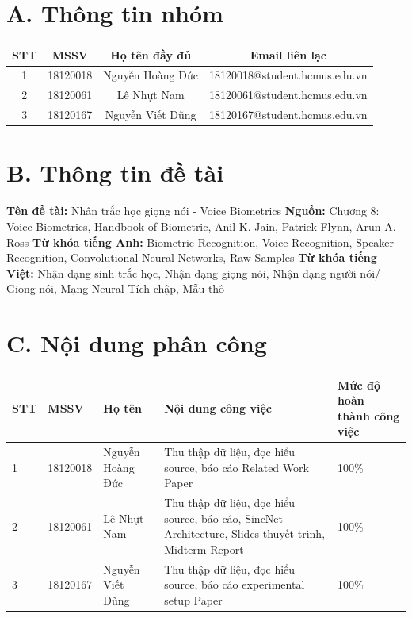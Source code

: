 \documentclass{article}
\newcommand\T{\rule{0pt}{2.6ex}}       %
\newcommand\B{\rule[-1.2ex]{0pt}{0pt}} %
\begin{document}
	\newpage
	\tableofcontents
	\newpage
	\setcounter{secnumdepth}{0}
	
	\section{A. Thông tin nhóm}
	\begin{tabular}{ | c | c | c | c |}\hline
		STT	& MSSV & Họ tên đầy đủ & Email liên lạc \T\B\\\hline
		1	& 18120018 & Nguyễn Hoàng Đức &  18120018@student.hcmus.edu.vn\T\B\\\hline
		2	& 18120061 & Lê Nhựt Nam &  18120061@student.hcmus.edu.vn\T\B\\\hline
		3	& 18120167 & Nguyễn Viết Dũng & 18120167@student.hcmus.edu.vn\T\B\\ \hline
	\end{tabular}
			
	\section{B. Thông tin đề tài}
	
	\textbf{Tên đề tài:} Nhân trắc học giọng nói - Voice Biometrics\newline
	\textbf{Nguồn:} Chương 8: Voice Biometrics, Handbook of Biometric, Anil K. Jain, Patrick Flynn, Arun A. Ross\newline
	\textbf{Từ khóa tiếng Anh:} Biometric Recognition, Voice Recognition, Speaker Recognition, Convolutional Neural Networks, Raw Samples\newline
	\textbf{Từ khóa tiếng Việt:} Nhận dạng sinh trắc học, Nhận dạng giọng nói, Nhận dạng người nói/ Giọng nói, Mạng Neural Tích chập, Mẫu thô
	
	\section{C. Nội dung phân công}
	\begin{center}
		\begin{tabular}{ | l | l | l | p{5cm} | p{3cm} |}
			\hline
			STT & MSSV & Họ tên & Nội dung công việc & Mức độ hoàn thành công việc  \T\B\\ \hline
			1 & 18120018 & Nguyễn Hoàng Đức & Thu thập dữ liệu, đọc hiểu source, báo cáo Related Work Paper & 100\%\T\B \\ \hline
			2 & 18120061 & Lê Nhựt Nam & Thu thập dữ liệu, đọc hiểu source, báo cáo, SincNet Architecture, Slides thuyết trình, Midterm Report & 100\%\T\B \\ \hline
			3 & 18120167 & Nguyễn Viết Dũng &  Thu thập dữ liệu, đọc hiểu source, báo cáo experimental setup Paper & 100\%\T\B \\ \hline
		\end{tabular}
	\end{center}
\end{document}
